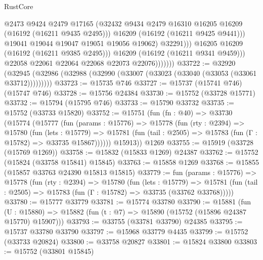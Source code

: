 \begin{lexlean}{RustCore}
\begin{coremodule}
                                @2473
                                @9424
                                @2479
                                @17165
                                (@32432
                                  @9434
                                  @2479
                                  @16310
                                  @16205
                                  @16209
                                  (@16192 (@16211 @9435 @2495)))
                                @16209
                                (@16192 (@16211 @9425 @9441)))
                              @19041
                              @19044
                              @19047
                              @19051
                              @19056
                              @19062)
                            @32291)))
                      @16205
                      @16209
                      (@16192 (@16211 @9385 @2495)))
                    @16209
                    (@16192 (@16211 @9341 @9459)))
                  @22058
                  @22061
                  @22064
                  @22068
                  @22073
                  @22076)))))))
@33722 := @32920
    (@32945 (@32986 (@32988 (@32990 (@33007 (@33023 (@33040 (@33053 (@33061 @33712)))))))))
@33723 := @15735 @746
@33727 := @15737 (@15741 @746) (@15747 @746)
@33728 := @15756 @24384
@33730 := @15752 (@33728 @15771)
@33732 := @15794 (@15795 @746)
@33733 := @15790 @33732
@33735 := @15752 (@33733 @15820)
@33752 := @15751
    (fun (fn : @40) =>
    @33730
      (@15774
        (@15777
          (fun (params : @15776) =>
          @15778
            (fun (rty : @2394) =>
            @15780
              (fun (lets : @15779) =>
              @15781 (fun (tail : @2505) => @15783 (fun (Γ : @15782) => @33735 @15867))))))
        @15913))
    @1269
@33755 := @15919 (@33728 (@15769 @1269))
@33758 := @15832 (@15833 @1269) @24387
@33762 := @15752 (@15824 (@33758 @15841) @15845)
@33763 := @15858 @1269
@33768 := @15855 (@15857 @33763 @24390 @15813 @15815)
@33779 := fun (params : @15776) =>
  @15778
    (fun (rty : @2394) =>
    @15780
      (fun (lets : @15779) =>
      @15781 (fun (tail : @2505) => @15783 (fun (Γ : @15782) => @33735 (@33762 @33768)))))
@33780 := @15777 @33779
@33781 := @15774 @33780
@33790 := @15881
    (fun (U : @15880) => @15882 (fun (t : @7) => @15890 (@15752 (@15896 @24387 @15770) @15907)))
@33793 := @33755 (@33781 @33790) @24385
@33795 := @15737 @33780 @33790
@33797 := @15968 @33779 @4435
@33799 := @15752 (@33733 @20824)
@33800 := @33758 @20827
@33801 := @15824 @33800
@33803 := @15752 (@33801 @15845)

\end{coremodule}
\end{lexlean}
